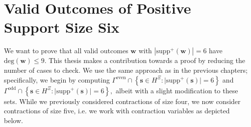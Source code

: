 \chapter{Valid Outcomes of Positive Support Size Six}

We want to prove that all valid outcomes \( \mathbf w \) with \( |\mathrm{supp}^+(\mathbf w)| = 6 \) have \( \mathrm{deg}(\mathbf w) \leq 9 \). This thesis makes a contribution towards a proof by reducing the number of cases to check. We use the same approach as in the previous chapters; specifically, we begin by computing 
\(
\Gamma^{\mathrm{even}} \cap \left\{ \mathbf{s} \in H^{\Xi} : \lvert \mathrm{supp}^+(\mathbf{s}) \rvert = 6 \right\}
\)
and 
\(
\Gamma^{\mathrm{odd}} \cap \left\{ \mathbf{s} \in H^{\Xi} : \lvert \mathrm{supp}^+(\mathbf{s}) \rvert = 6 \right\},
\)
albeit with a slight modification to these sets. While we previously considered contractions of size four, we now consider contractions of size five, i.e. we work with contraction variables as depicted below. 
